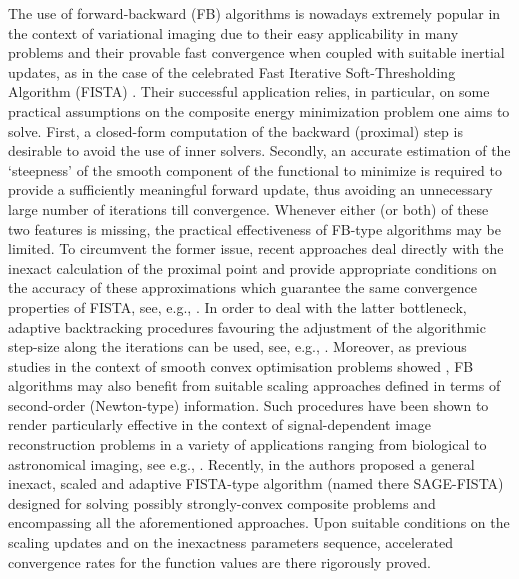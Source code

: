 \documentclass[conference]{IEEEtran}
\begin{document}
The use of forward-backward (FB) algorithms is nowadays extremely popular in the context of variational imaging due to their easy applicability in many problems and their provable fast convergence when coupled with suitable  inertial updates, as in the case of the celebrated Fast Iterative Soft-Thresholding Algorithm (FISTA)  \cite{Beck-Teboulle-2009b}. Their successful application relies, in particular, on some practical assumptions on the composite energy minimization problem one aims to solve. First, a closed-form computation of the backward (proximal) step is desirable to avoid the use of inner solvers. Secondly, an accurate estimation of the `steepness' of the smooth component of the functional to minimize is required to provide a sufficiently meaningful forward update, thus avoiding an unnecessary large number of iterations till convergence. Whenever either (or both) of these two features is missing, the practical effectiveness of FB-type algorithms may be limited. To circumvent the former issue, recent approaches deal directly with the inexact calculation of the proximal point and provide appropriate conditions on the accuracy of these approximations which guarantee the same convergence properties of FISTA, see, e.g., \cite{Bonettini2018a,Bonettini2019}. In order to deal with the latter bottleneck, adaptive backtracking procedures favouring the adjustment of the algorithmic step-size along the iterations can be used, see, e.g.,  \cite{Scheinberg-2014,Calatroni-Chambolle-2019}.  Moreover, as previous studies in the context of smooth convex optimisation problems showed \cite{Lanteri-etal-2001}, FB algorithms may also benefit from suitable scaling approaches defined in terms of second-order (Newton-type) information. Such procedures have been shown to render particularly effective in the context of signal-dependent image reconstruction problems in a variety of applications ranging from biological to astronomical imaging, see e.g., \cite{Bertero2018}. Recently,  in \cite{SAGE-FISTA} the authors proposed a general inexact, scaled and adaptive FISTA-type algorithm  (named there SAGE-FISTA) designed for solving possibly strongly-convex composite problems and encompassing all the aforementioned approaches. Upon suitable conditions on the scaling updates and on the inexactness parameters sequence, accelerated convergence rates for the function values are there rigorously proved. 

\medskip
\end{document}
